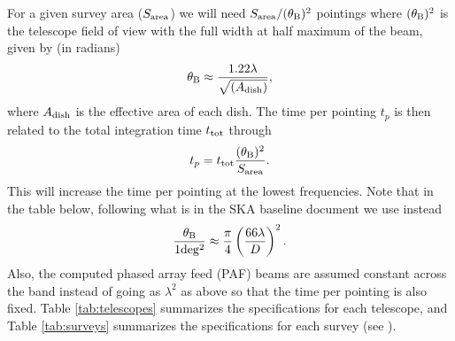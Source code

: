 \documentclass[useAMS,usenatbib]{mn2e}
\begin{document}
For a given survey area ($S_{\rm area}$) we will need $S_{\rm area}/(\theta_{\rm B})^2$ pointings where $(\theta_{\rm B})^2$ is the telescope field of view with the full width at half maximum of the beam, given by (in radians)
\begin{equation}
\theta_{\rm B} \approx \frac{1.22 \lambda}{\sqrt{(A_{\rm dish})}},
\end{equation}
where $A_{\rm dish}$ is the effective area of each dish.
The time per pointing $t_p$ is then related to the total integration time $t_{\rm tot}$ through
\begin{equation}
t_p=t_{\rm tot} \frac{(\theta_{\rm B})^2}{S_{\rm area}}.
\end{equation}
This will increase the time per pointing at the lowest frequencies.
Note that in the table below, following what is in the SKA baseline document we use instead
\begin{equation}
\frac{\theta_{\rm B}}{1{\rm deg^2}} \approx \frac{\pi}{4}\left(\frac{66\lambda}{D}\right)^2.
\end{equation}
Also, the computed phased array feed (PAF) beams are assumed constant across the band instead of going as $\lambda^2$ as above so that the time per pointing is also fixed. Table \ref{tab:telescopes} summarizes the specifications for each telescope, and Table \ref{tab:surveys} summarizes the specifications for each survey (see \cite{Bull:2014rha}).
\end{document}
